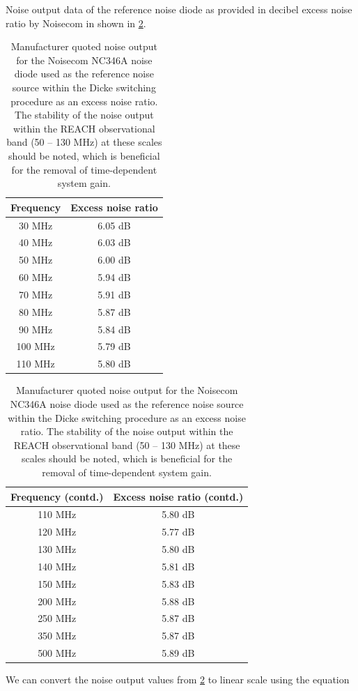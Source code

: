 Noise output data of the reference noise diode as provided in decibel excess noise ratio by Noisecom in shown in \cref{tab:ns_noise}.
\begin{table}
    \begin{center}
    \begin{tabular}{ |c|c| }
        \hline
        {Frequency} & {Excess noise ratio} \\
        \hline
        30 MHz & 6.05 dB \\
        40 MHz & 6.03 dB \\
        50 MHz & 6.00 dB \\
        60 MHz & 5.94 dB \\
        70 MHz & 5.91 dB \\
        80 MHz & 5.87 dB \\
        90 MHz & 5.84 dB \\
        100 MHz & 5.79 dB \\
        110 MHz & 5.80 dB \\
        \hline
    \end{tabular}
    \quad
    \begin{tabular}{ |c|c| }
        \hline
        {Frequency (contd.)} & {Excess noise ratio (contd.)} \\
        \hline
        110 MHz & 5.80 dB \\
        120 MHz & 5.77 dB \\
        130 MHz & 5.80 dB \\
        140 MHz & 5.81 dB \\
        150 MHz & 5.83 dB \\
        200 MHz & 5.88 dB \\
        250 MHz & 5.87 dB \\
        350 MHz & 5.87 dB \\
        500 MHz & 5.89 dB \\
        \hline
    \end{tabular}
    \end{center}
    \caption{Manufacturer quoted noise output for the Noisecom NC346A noise diode used as the reference noise source within the Dicke switching procedure as an excess noise ratio. The stability of the noise output within the REACH observational band (50 -- 130 MHz) at these scales should be noted, which is beneficial for the removal of time-dependent system gain.}
    \label{tab:ns_noise}
\end{table}
We can convert the noise output values from \cref{tab:ns_noise} to linear scale using the equation
